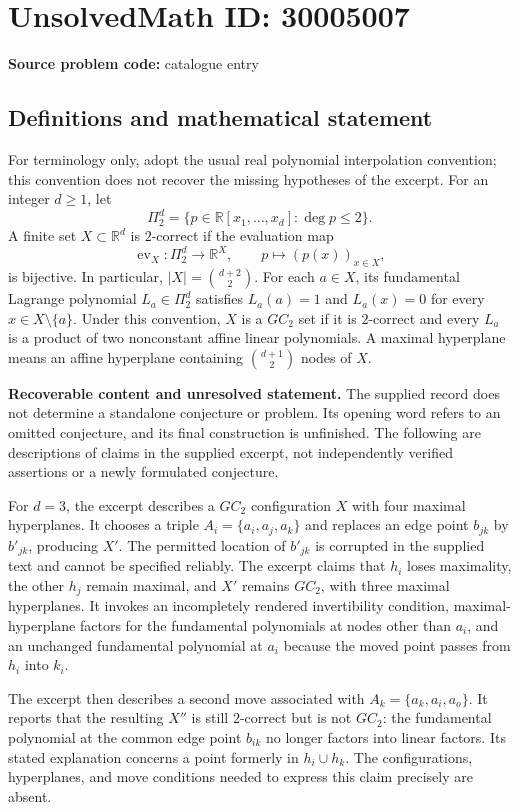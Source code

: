\documentclass[11pt]{article}
\newcommand{\R}{\mathbb{R}}
\begin{document}
\section*{UnsolvedMath ID: 30005007}
\textbf{Source problem code:} catalogue entry
\subsection{Definitions and mathematical statement}
For terminology only, adopt the usual real polynomial interpolation convention; this convention does not recover the missing hypotheses of the excerpt. For an integer \(d\geq 1\), let
\[
\Pi_2^d=\{p\in\R[x_1,\ldots,x_d]:\deg p\leq 2\}.
\]
A finite set \(X\subset\R^d\) is \(2\)-correct if the evaluation map
\[
\operatorname{ev}_X:\Pi_2^d\longrightarrow\R^X,
\qquad p\longmapsto(p(x))_{x\in X},
\]
is bijective. In particular, \(|X|=\binom{d+2}{2}\). For each \(a\in X\), its fundamental Lagrange polynomial \(L_a\in\Pi_2^d\) satisfies \(L_a(a)=1\) and \(L_a(x)=0\) for every \(x\in X\setminus\{a\}\). Under this convention, \(X\) is a \(GC_2\) set if it is \(2\)-correct and every \(L_a\) is a product of two nonconstant affine linear polynomials. A maximal hyperplane means an affine hyperplane containing \(\binom{d+1}{2}\) nodes of \(X\).

\textbf{Recoverable content and unresolved statement.} The supplied record does not determine a standalone conjecture or problem. Its opening word refers to an omitted conjecture, and its final construction is unfinished. The following are descriptions of claims in the supplied excerpt, not independently verified assertions or a newly formulated conjecture.

For \(d=3\), the excerpt describes a \(GC_2\) configuration \(X\) with four maximal hyperplanes. It chooses a triple \(A_i=\{a_i,a_j,a_k\}\) and replaces an edge point \(b_{jk}\) by \(b'_{jk}\), producing \(X'\). The permitted location of \(b'_{jk}\) is corrupted in the supplied text and cannot be specified reliably. The excerpt claims that \(h_i\) loses maximality, the other \(h_j\) remain maximal, and \(X'\) remains \(GC_2\), with three maximal hyperplanes. It invokes an incompletely rendered invertibility condition, maximal-hyperplane factors for the fundamental polynomials at nodes other than \(a_i\), and an unchanged fundamental polynomial at \(a_i\) because the moved point passes from \(h_i\) into \(k_i\).

The excerpt then describes a second move associated with \(A_k=\{a_k,a_i,a_o\}\). It reports that the resulting \(X''\) is still \(2\)-correct but is not \(GC_2\): the fundamental polynomial at the common edge point \(b_{ik}\) no longer factors into linear factors. Its stated explanation concerns a point formerly in \(h_i\cup h_k\). The configurations, hyperplanes, and move conditions needed to express this claim precisely are absent.
\end{document}
